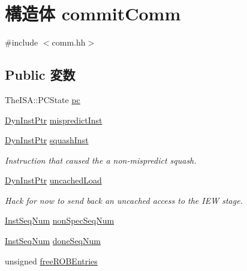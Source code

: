 \hypertarget{structTimeBufStruct_1_1commitComm}{
\section{構造体 commitComm}
\label{structTimeBufStruct_1_1commitComm}
}


{\ttfamily \#include $<$comm.hh$>$}\subsection*{Public 変数}
\begin{DoxyCompactItemize}
\item 
TheISA::PCState \hyperlink{structTimeBufStruct_1_1commitComm_ad3585c83b0eac985107aa5a86e43e1b4}{pc}
\item 
\hyperlink{structTimeBufStruct_a028ce10889c5f6450239d9e9a7347976}{DynInstPtr} \hyperlink{structTimeBufStruct_1_1commitComm_a30072968ccd286f8f546aa26eb2c5c33}{mispredictInst}
\item 
\hyperlink{structTimeBufStruct_a028ce10889c5f6450239d9e9a7347976}{DynInstPtr} \hyperlink{structTimeBufStruct_1_1commitComm_afa5fc700e0c019c77c06164b8aa9367d}{squashInst}
\begin{DoxyCompactList}\small\item\em Instruction that caused the a non-\/mispredict squash. \item\end{DoxyCompactList}\item 
\hyperlink{structTimeBufStruct_a028ce10889c5f6450239d9e9a7347976}{DynInstPtr} \hyperlink{structTimeBufStruct_1_1commitComm_a45b8aff83b2d4696abea3583a02ea31e}{uncachedLoad}
\begin{DoxyCompactList}\small\item\em Hack for now to send back an uncached access to the IEW stage. \item\end{DoxyCompactList}\item 
\hyperlink{inst__seq_8hh_a258d93d98edaedee089435c19ea2ea2e}{InstSeqNum} \hyperlink{structTimeBufStruct_1_1commitComm_a2109aaf648ce5c87f53ac688b4e51db1}{nonSpecSeqNum}
\item 
\hyperlink{inst__seq_8hh_a258d93d98edaedee089435c19ea2ea2e}{InstSeqNum} \hyperlink{structTimeBufStruct_1_1commitComm_a45920c1d79a22b1320274c5f53504654}{doneSeqNum}
\item 
unsigned \hyperlink{structTimeBufStruct_1_1commitComm_a87a4648b43fbb12beaf408d684fff6dc}{freeROBEntries}

\end{DoxyCompactItemize}
